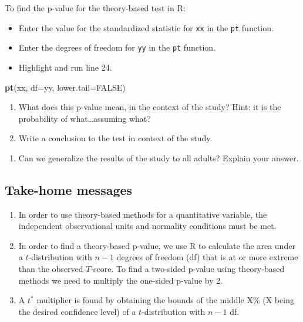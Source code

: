 \documentclass[
]{report}
\newenvironment{Shaded}{\begin{snugshade}}{\end{snugshade}}
\newcommand{\AttributeTok}[1]{\textcolor[rgb]{0.13,0.29,0.53}{#1}}
\newcommand{\ConstantTok}[1]{\textcolor[rgb]{0.56,0.35,0.01}{#1}}
\newcommand{\FunctionTok}[1]{\textcolor[rgb]{0.13,0.29,0.53}{\textbf{#1}}}
\newcommand{\NormalTok}[1]{#1}
\providecommand{\tightlist}{%
  \setlength{\itemsep}{0pt}\setlength{\parskip}{0pt}}
\begin{document}
To find the p-value for the theory-based test in R:

\begin{itemize}
\item
  Enter the value for the standardized statistic for \texttt{xx} in the \texttt{pt} function.
\item
  Enter the degrees of freedom for \texttt{yy} in the \texttt{pt} function.
\item
  Highlight and run line 24.
\end{itemize}

\begin{Shaded}
\begin{Highlighting}[]
\FunctionTok{pt}\NormalTok{(xx, }\AttributeTok{df=}\NormalTok{yy, }\AttributeTok{lower.tail=}\ConstantTok{FALSE}\NormalTok{)}
\end{Highlighting}
\end{Shaded}

\begin{enumerate}
\def\labelenumi{\arabic{enumi}.}
\setcounter{enumi}{11}
\item
  What does this p-value mean, in the context of the study? Hint: it is the probability of what\ldots assuming what?
  \vspace{1in}
\item
  Write a conclusion to the test in context of the study.
\end{enumerate}

\vspace{0.6in}

\begin{enumerate}
\def\labelenumi{\arabic{enumi}.}
\setcounter{enumi}{13}
\tightlist
\item
  Can we generalize the results of the study to all adults? Explain your answer.
\end{enumerate}

\vspace{0.5in}

\subsection{Take-home messages}\label{take-home-messages-12}

\begin{enumerate}
\def\labelenumi{\arabic{enumi}.}
\item
  In order to use theory-based methods for a quantitative variable, the independent observational units and normality conditions must be met.
\item
  In order to find a theory-based p-value, we use R to calculate the area under a \(t\)-distribution with \(n - 1\) degrees of freedom (df) that is at or more extreme than the observed \(T\)-score. To find a two-sided p-value using theory-based methods we need to multiply the one-sided p-value by 2.
\item
  A \(t^*\) multiplier is found by obtaining the bounds of the middle X\% (X being the desired confidence level) of a \(t\)-distribution with \(n - 1\) df.
\end{enumerate}
\end{document}
